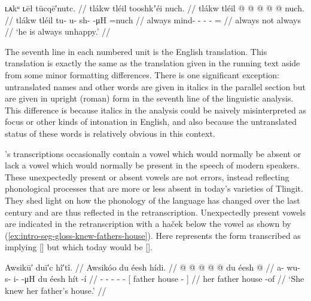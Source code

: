 \ex\label{ex:intro-seg-gloss-unhappy}%
%
\begingl
	\glpreamble	ʟᴀkᵘ ʟēł tūcqē′nutc. //
	\glpreamble	tlákw tléil tooshkʼéi nuch. //
	\gla	tlákw tléil  @ {} @ {} @ {} @ {} @ \•nuch. //
	\glb	tlákw tléil tu- u- sh-  -μH =nuch //
	\glc	always  mind- - -  - = //
	\gld	always not  {} {} {} {} \•always //
	\glft	‘he is always unhappy.’
		//
\endgl
\xe

The seventh line in each numbered unit is the English translation.
This translation is exactly the same as the translation given in the running text aside from some minor formatting differences.
There is one significant exception: untranslated names and other words are given in italics in the parallel section but are given in upright (roman) form in the seventh line of the linguistic analysis.
This difference is because italics in the analysis could be naively misinterpreted as focus or other kinds of intonation in English, and also because the untranslated status of these words is relatively obvious in this context.

\citeauthor{swanton:1909}’s transcriptions occasionally contain a vowel which would normally be absent or lack a vowel which would normally be present in the speech of modern speakers.
These unexpectedly present or absent vowels are not errors, instead reflecting phonological processes that are more or less absent in today’s varieties of Tlingit.
They shed light on how the phonology of the language has changed over the last century and are thus reflected in the retranscription.
Unexpectedly present vowels are indicated in the retranscription with a haček below the vowel as shown by (\ref{ex:intro-seg-gloss-knew-fathers-house}).
Here  represents the form \citeauthor{swanton:1909} transcribed as  implying  [] but which today would be  [].

\ex\label{ex:intro-seg-gloss-knew-fathers-house}%
%
\begingl
	\glpreamble	Awsikū′ duī′c hî′tî. //
	\glpreamble	Awsikóo du éesh hídi. //
	\gla	{} @ {} @ {} @ {} @ {} @ {}
		{} du éesh  @ {} {} //
	\glb	a- wu- s- i-  -μH
		{} du éesh hít -í {} //
	\glc	{}- - - -  -
		{}[  father house - {}] //
	\gld	{} {} {} {} {} {}
		{} her father house -of {} //
	\glft	‘She knew her father’s house.’
		//
\endgl
\xe

